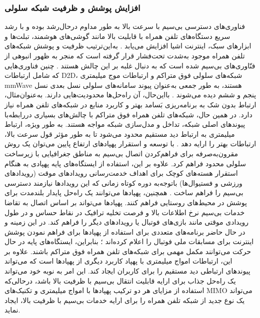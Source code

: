 \subsubsection{افزایش پوشش و ظرفیت شبکه سلولی} 

فناوری‌های دسترسی بی‌سیم با سرعت بالا به طور مداوم درحال‌رشد بوده و با رشد سریع دستگاه‌های تلفن همراه با قابلیت بالا مانند گوشی‌های هوشمند، تبلت‌ها و ابزارهای سبک، اینترنت اشیا افزایش می‌یابد \cite{zanella2014internet}. به‌این‌ترتیب ظرفیت و پوشش شبکه‌های تلفن همراه موجود به‌شدت تحت‌فشار قرار گرفته است که منجر به ظهور انبوهی از فنّاوری‌های بی‌سیم شده است که به دنبال غلبه بر این چالش هستند \cite{8675384}. 
چنین فناوری‌هایی که شامل ارتباطات  \gls{D2D}، شبکه‌های سلولی فوق متراکم و ارتباطات موج میلیمتری \gls{mmWave} هستند، به طور جمعی به‌عنوان پیوند سامانه‌های سلولی نسل بعدی نسل پنجم و ششم دیده می‌شوند \cite{samarakoon2016ultra,semiari2015context}. بااین‌حال، آن راه‌حل‌ها محدودیت‌هایی دارند. به‌عنوان‌مثال، ارتباط  بدون شک به برنامه‌ریزی بَسامد بهتر و کاربرد منابع در شبکه‌های تلفن همراه نیاز دارد. در همین حال، شبکه‌های تلفن همراه فوق متراکم با چالش‌های بسیاری دررابطه‌با پیوندهای اصلی شبکه، تداخل و مدل‌سازی شبکه مواجه هستند.
به طور ویژه، ارتباط میلیمتری به ارتباط دید مستقیم محدود می‌شود تا به طور مؤثر قول سرعت بالا، ارتباطات بهتر را ارایه دهد \cite{Ashraf2024}.
با توسعه و استقرار پهپادهای ارتفاع پایین می‌توان یک روش مقرون‌به‌صرفه برای فراهم‌کردن اتصال بی‌سیم به مناطق جغرافیایی با زیرساخت سلولی محدود فراهم کرد. علاوه بر این، استفاده از ایستگاه‌های پایه پهپادی به هنگام استقرار هسته‌های کوچک برای اهداف خدمت‌رسانی رویدادهای موقت (رویدادهای ورزشی و فستیوال‌ها) باتوجه‌به دوره کوتاه زمانی که این رویدادها نیازمند دسترسی بی‌سیم را فراهم ساخت \cite{drones7090555}. همچنین، پهپادها می‌توانند یک راه‌حل پایدار بلندمدت برای پوشش در محیط‌های روستایی فراهم کنند. پهپادها می‌تواند بر اساس اتصال به تقاضا خدمات بی‌سیم نرخ اطلاعات بالا و فرصت تخلیه ترافیک \cite{bor2016new,bucaille2013rapidly,lyu2018uav} در نقاط حساس و در طول رویدادی موقتی مانند بازی‌های فوتبال یا رویدادهای دیگر را فراهم کند. در این زمینه   و  در حال حاضر برنامه‌های متعددی برای استفاده از پهپادها برای فراهم نمودن پوشش اینترنت برای مسابقات ملی فوتبال را اعلام کرده‌اند \cite{fuller2016t}؛ بنابراین، ایستگاه‌های پایه در حال حرکت می‌توانند مکمل مهمی برای شبکه‌های تلفن همراه فوق متراکم باشند.
علاوه بر این، ارتباطات امواج میلیمتری با پهپاد کاربرد دیگری از پهپادها است که می‌تواند پیوندهای ارتباطی دید مستقیم را برای کاربران ایجاد کند. این امر به نوبه خود می‌تواند یک راه‌حل جذاب برای ارایه قابلیت انتقال بی‌سیم با ظرفیت بالا باشد، درحالی‌که استفاده از مزایای هر دو ترکیب پهپادها با امواج میلیمتری و تکنیک‌های \gls{MIMO} می‌تواند یک نوع جدید از شبکه تلفن همراه را برای ارایه خدمات بی‌سیم با ظرفیت بالا، ایجاد نماید.
